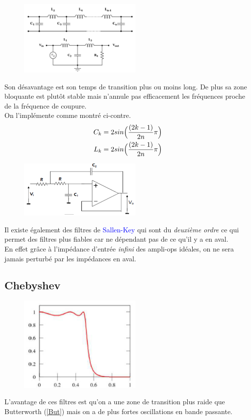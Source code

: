 \documentclass{report}
\begin{document}
\begin{figure}
\centering
\includegraphics[width=6cm]{img/Butter.png}
\end{figure}
Son désavantage est son temps de transition plus ou moins long. De plus sa zone bloquante est plutôt stable mais n'annule pas efficacement les fréquences proche de la fréquence de coupure.\\
On l'implémente comme montré ci-contre.
\begin{align*}
C_k &= 2 sin \Bigl( \frac{(2k -1)}{2n} \pi \Bigl)\\
L_k &= 2 sin \Bigl( \frac{(2k -1)}{2n} \pi \Bigl)
\end{align*}
\begin{figure}
\centering
\includegraphics[width=6cm]{img/SallenKey.png}
\end{figure}
Il existe également des filtres de \textcolor{blue}{Sallen-Key} qui sont du \textit{deuxième ordre} ce qui permet des filtres plus fiables car ne dépendant pas de ce qu'il y a en aval.\\
En effet grâce à l'impédance d'entrée \textit{infini} des ampli-ops idéales, on ne sera jamais perturbé par les impédances en aval.

\subsection{Chebyshev}
\begin{figure}
\centering
\includegraphics[width=6cm]{img/Cheby.png}
\end{figure}
L'avantage de ces filtres est qu'on a une zone de transition plus raide que Butterworth (\ref{But}) mais on a de plus fortes oscillations en bande passante.
\end{document}
